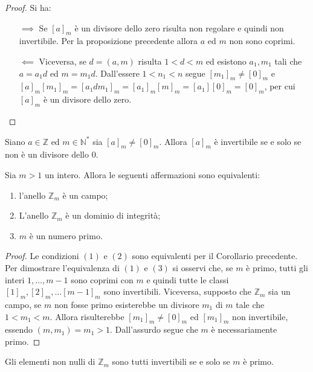 \begin{proof} Si ha:
	\begin{itemize}
		\item[$\implies$] Se $[a]_{m}$ è un divisore dello zero risulta non regolare e quindi non invertibile. Per la proposizione precedente allora $a$ ed $m$ non sono coprimi. 
		
		\item[$\impliedby$] Viceversa, se $d=(a,m)$ risulta $1<d<m$ ed esistono $a_{1},m_{1}$ tali che $a=a_{1}d$ ed $m=m_{1}d$. Dall'essere $1<n_{1}<n$ segue $[m_{1}]_{m} \neq [0]_{m}$ e $[a]_{m}[m_{1}]_{m} = [a_{1}dm_{1}]_{m} = [a_{1}]_{m}[m]_{m} = [a_{1}][0]_{m}= [0]_{m}$, per cui $[a]_{m}$ è un divisore dello zero.
	\end{itemize}
\end{proof}

\begin{corolbox}
	Siano $a \in \mathbb{Z}$ ed $m \in \mathbb{N}^{*}$ sia $[a]_{m} \neq [0]_{m}$. Allora $[a]_{m}$ è invertibile se e solo se non è un divisore dello 0.
\end{corolbox}

\begin{teorbox}\label{thm:car_anelli_zm}
	Sia $m>1$ un intero. Allora le seguenti affermazioni sono equivalenti:
	\begin{enumerate}
		\item l'anello $\mathbb{Z}_{m}$ è un campo;
		\item L'anello $\mathbb{Z}_{m}$ è un dominio di integrità;
		\item $m$ è un numero primo.
	\end{enumerate}
\end{teorbox}

\begin{proof}
	Le condizioni $(1)$ e $(2)$ sono equivalenti per il Corollario precedente. Per dimostrare l'equivalenza di $(1)$ e $(3)$ si osservi che, se $m$ è primo, tutti gli interi $1, \ldots, m-1$ sono coprimi con $m$ e quindi tutte le classi $[1]_{m},[2]_{m},\ldots [m-1]_{m}$ sono invertibili. Viceversa, supposto che $\mathbb{Z}_{m}$ sia un campo, se $m$ non fosse primo esisterebbe un divisore $m_{1}$ di $m$ tale che $1 < m_{1} < m$. Allora risulterebbe $[m_{1}]_{m} \neq [0]_{m}$ ed $[m_{1}]_{m}$ non invertibile, essendo $(m,m_{1}) = m_{1}>1$. Dall'assurdo segue che $m$ è necessariamente primo.
\end{proof} 


\begin{corolbox}
	Gli elementi non nulli di $\mathbb{Z}_{m}$ sono tutti invertibili se e solo se $m$ è primo.
\end{corolbox}

